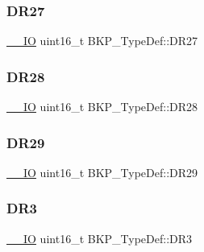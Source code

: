 \mbox{\label{struct_b_k_p___type_def_ad5e851ff7c4e78c3ec10bedf4cbec918}} 
\subsubsection{\texorpdfstring{DR27}{DR27}}
{\footnotesize\ttfamily \mbox{\hyperlink{group___c_m_s_i_s___c_m3__core__definitions_gaec43007d9998a0a0e01faede4133d6be}{\+\_\+\+\_\+\+IO}} uint16\+\_\+t B\+K\+P\+\_\+\+Type\+Def\+::\+D\+R27}

\mbox{\label{struct_b_k_p___type_def_a741b11fc49b1b78afeb0585844b1f12d}} 
\subsubsection{\texorpdfstring{DR28}{DR28}}
{\footnotesize\ttfamily \mbox{\hyperlink{group___c_m_s_i_s___c_m3__core__definitions_gaec43007d9998a0a0e01faede4133d6be}{\+\_\+\+\_\+\+IO}} uint16\+\_\+t B\+K\+P\+\_\+\+Type\+Def\+::\+D\+R28}

\mbox{\label{struct_b_k_p___type_def_a39b3d425209555dfe74c0b51c565115d}} 
\subsubsection{\texorpdfstring{DR29}{DR29}}
{\footnotesize\ttfamily \mbox{\hyperlink{group___c_m_s_i_s___c_m3__core__definitions_gaec43007d9998a0a0e01faede4133d6be}{\+\_\+\+\_\+\+IO}} uint16\+\_\+t B\+K\+P\+\_\+\+Type\+Def\+::\+D\+R29}

\mbox{\label{struct_b_k_p___type_def_a034cf532a9752513de879c0f4ff38d0a}} 
\subsubsection{\texorpdfstring{DR3}{DR3}}
{\footnotesize\ttfamily \mbox{\hyperlink{group___c_m_s_i_s___c_m3__core__definitions_gaec43007d9998a0a0e01faede4133d6be}{\+\_\+\+\_\+\+IO}} uint16\+\_\+t B\+K\+P\+\_\+\+Type\+Def\+::\+D\+R3}

